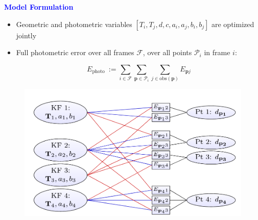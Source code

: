 \documentclass[aspectratio=169]{beamer}
\begin{document}
\begin{frame}{\textcolor{blue}{\textbf{Model Formulation}}}
	\vspace{-0.5cm}
	\begin{itemize}
			\item Geometric and photometric variables $\left[T_i, T_j , d, c, a_i, a_j , b_i, b_j\right]$ are optimized jointly
			\item Full photometric error over all frames $\mathcal{F}$, over all points $\mathcal{P}_i$ in frame $i$:
			
			\begin{equation}
				E_{\text {photo }}:=\sum_{i \in \mathcal{F}} \sum_{\mathbf{p} \in \mathcal{P}_i} \sum_{j \in \mathrm{obs}(\mathbf{p})} E_{\mathbf{p} j} 
			\end{equation}
	\end{itemize}

	\vspace{-0.5cm}

	\begin{figure}
		\centering
		\includegraphics[height=0.4\textheight]{pics/dso_factor_graph.png}
	\end{figure}

\end{frame}
\end{document}

